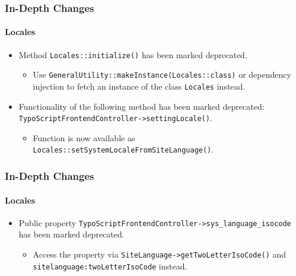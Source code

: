 \begin{frame}[fragile]
	\frametitle{In-Depth Changes}
	\framesubtitle{Locales}

	\begin{itemize}
		\item Method \texttt{Locales::initialize()} has been marked deprecated.

			\begin{itemize}\smaller
				\item[\ding{228}] Use \texttt{GeneralUtility::makeInstance(Locales::class)} or
				dependency injection to fetch an instance of the class \texttt{Locales} instead.
			\end{itemize}\normalsize

		\item Functionality of the following method has been marked deprecated:\newline
			\texttt{TypoScriptFrontendController->settingLocale()}.

			\begin{itemize}\smaller
				\item[\ding{228}] Function is now available as
				{\fontsize{8}{8} \selectfont \texttt{Locales::setSystemLocaleFromSiteLanguage()}.}
			\end{itemize}\normalsize

	\end{itemize}

\end{frame}


\begin{frame}[fragile]
	\frametitle{In-Depth Changes}
	\framesubtitle{Locales}

	\begin{itemize}
		\item Public property \texttt{TypoScriptFrontendController->sys\_language\_isocode}
			has been marked deprecated.

			\begin{itemize}\smaller
				\item[\ding{228}] Access the property via \texttt{SiteLanguage->getTwoLetterIsoCode()}
				and \texttt{sitelanguage:twoLetterIsoCode} instead.
			\end{itemize}\normalsize

	\end{itemize}

\end{frame}

